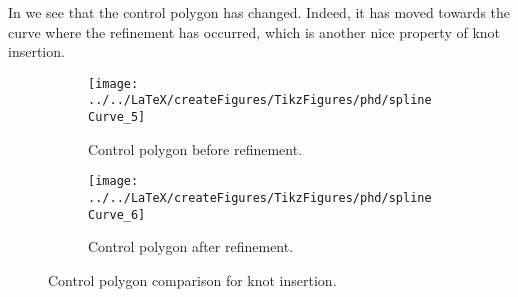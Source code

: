 In  we see that the control polygon has changed. Indeed, it has moved towards the curve where the refinement has occurred, which is another nice property of knot insertion.
\begin{figure}
        \centering        
        \begin{subfigure}{0.49\textwidth}
       		\centering
			\texttt{[image: ../../LaTeX/createFigures/TikzFigures/phd/splineCurve\_5]}
            \caption{Control polygon before refinement.}
        \end{subfigure}%
        \hspace*{0.02\textwidth}%
        \begin{subfigure}{0.49\textwidth}
       		\centering
			\texttt{[image: ../../LaTeX/createFigures/TikzFigures/phd/splineCurve\_6]}
            \caption{Control polygon after refinement.}
        \end{subfigure}
        \caption{Control polygon comparison for knot insertion.}\label{Fig:splineCurveRefined2}
\end{figure}

